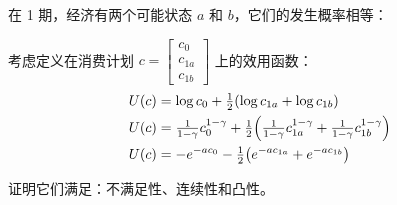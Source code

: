 \begin{problem}
 在 1 期，经济有两个可能状态 $a$ 和 $b$，它们的发生概率相等：
\begin{center}
\end{center}
考虑定义在消费计划 $c=\begin{bmatrix}c_{0} \\ c_{1a} \\ c_{1b}\end{bmatrix}$ 上的效用函数：
\[
    \begin{aligned}
        U(c) &= \log c_{0}+\tfrac12(\log c_{1a}+\log c_{1b})\\
        U(c) &= \tfrac{1}{1-\gamma}c_{0}^{1-\gamma}+\tfrac12\Bigl(\tfrac{1}{1-\gamma}c_{1a}^{1-\gamma}+\tfrac{1}{1-\gamma}c_{1b}^{1-\gamma}\Bigr)\\
        U(c) &= -e^{-ac_{0}}-\tfrac12\bigl(e^{-ac_{1a}}+e^{-ac_{1b}}\bigr)
    \end{aligned}
\]

证明它们满足：不满足性、连续性和凸性。
\end{problem}
